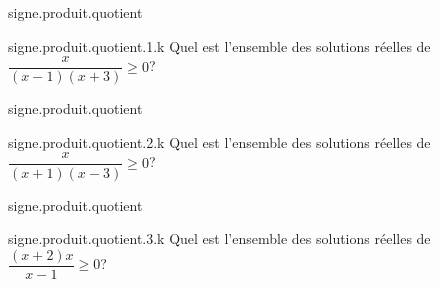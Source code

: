 \begin{qcm}{signe.produit.quotient}
    \begin{question}{signe.produit.quotient.1.k}
         Quel est l'ensemble des solutions réelles de \(\dfrac{x}{(x-1)(x+3)}\geqslant 0\)?
         \vspace{0.1cm}
         \begin{reponses}
            \mauvaise{\(]-\infty,-3[\cup]-3,0[\cup]0,1[\cup]1,+\infty[\)}
            \mauvaise{\(]-\infty,-3[\cup[0,1[\)}
            \bonne{\(]-3,0] \cup]1,+\infty[\)}
            \mauvaise{\(]-\infty,-3[\cup]1,+\infty[\)}
            \mauvaise{\([-3,1]\)}
         \end{reponses}
         \vspace{0.4cm}
    \end{question}
\end{qcm}

\begin{qcm}{signe.produit.quotient}
    \begin{question}{signe.produit.quotient.2.k}
         Quel est l'ensemble des solutions réelles de \(\dfrac{x}{(x+1)(x-3)}\geqslant 0\)?
         \vspace{0.1cm}
         \begin{reponses}
            \mauvaise{\(]-\infty,-1[\cup]-1,0[\cup]0,3[\cup]3,+\infty[\)}
            \mauvaise{\(]-\infty,-1[\cup[0,3[\)}
            \bonne{\(]-1,0] \cup]3,+\infty[\)}
            \mauvaise{\(]-\infty,-1[\cup]3,+\infty[\)}
            \mauvaise{\([-1,3]\)}
         \end{reponses}
         \vspace{0.4cm}
    \end{question}
\end{qcm}

\begin{qcm}{signe.produit.quotient}
    \begin{question}{signe.produit.quotient.3.k}
         Quel est l'ensemble des solutions réelles de \(\dfrac{(x+2)x}{x-1}\geqslant 0\)?
         \vspace{0.1cm}
         \begin{reponses}
            \mauvaise{\(]-\infty,-2[\cup]-2,0[\cup]0,1[\cup]1,+\infty[\)}
            \mauvaise{\(]-\infty,-2[\cup]1,+\infty[\)}
            \bonne{\([-2,0] \cup]1,+\infty[\)}
            \mauvaise{\(]-\infty,-2[\cup]0,1[\)}
            \mauvaise{\(]-2,0[\)}
         \end{reponses}
         \vspace{0.4cm}
    \end{question}
\end{qcm}

